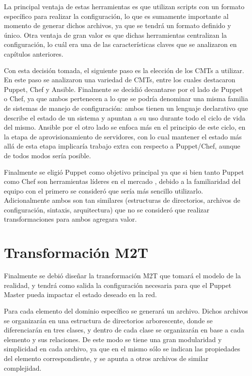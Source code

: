 La principal ventaja de estas herramientas es que utilizan scripts con un formato específico para realizar la configuración, lo que es sumamente importante al momento de generar dichos archivos, ya que se tendrá un formato definido y único. Otra ventaja de gran valor es que dichas herramientas centralizan la configuración, lo cuál era una de las características claves que se analizaron en capítulos anteriores.

Con esta decisión tomada, el siguiente paso es la elección de los CMTs a utilizar. En este paso se analizaron una variedad de CMTs, entre los cuales destacaron Puppet, Chef y Ansible. Finalmente se decidió decantarse por el lado de Puppet o Chef, ya que ambos pertenecen a lo que se podría denominar una misma familia de sistemas de manejo de configuración: ambos tienen un lenguaje declarativo que describe el estado de un sistema y apuntan a su uso durante todo el ciclo de vida del mismo. Ansible por el otro lado se enfoca más en el principio de este ciclo, en la etapa de aprovisionamiento de servidores, con lo cual mantener el estado más allá de esta etapa implicaría trabajo extra con respecto a Puppet/Chef, aunque de todos modos sería posible.

Finalmente se eligió Puppet como objetivo principal ya que si bien tanto Puppet como Chef son herramientas líderes en el mercado \cite{puppetmarket}, debido a la familiaridad del equipo con el primero se consideró que sería más sencillo utilizarlo. Adicionalmente ambos son tan similares (estructuras de directorios, archivos de configuración, sintaxis, arquitectura) que no se consideró que realizar transformaciones para ambos agregara valor.

\section{Transformación M2T}

Finalmente se debió diseñar la transformación M2T que tomará el modelo de la realidad, y tendrá como salida la configuración necesaria para que el Puppet Master pueda impactar el estado deseado en la red.

Para cada elemento del dominio específico se generará un archivo. Dichos archivos se organizarán en una estructura de directorios arborescente, donde se diferenciarán en tres clases, y dentro de cada clase se organizarán en base a cada elemento y sus relaciones.
De este modo se tiene una gran modularidad y simplicidad en cada archivo, ya que en el mismo sólo se indican las propiedades del elemento correspondiente, y se apunta a otros archivos de similar complejidad.

